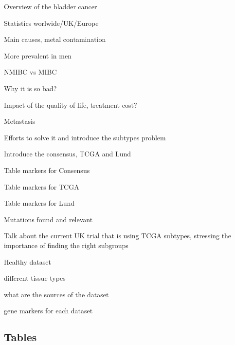 \begin{todolist}
    \item Overview of the bladder cancer 
    \begin{todolist}
        \item [\done] Statistics worlwide/UK/Europe
        \item [\done] Main causes, metal contamination
        \item [\done] More prevalent in men
        \item [\done] NMIBC vs MIBC
    \end{todolist}
    \item Why it is so bad? 
    \begin{todolist}
        \item [\done] Impact of the quality of life, treatment cost?
        \item [\done] Metastasis
    \end{todolist}
    \item Efforts to solve it and introduce the subtypes problem
    \item Introduce the consensus, TCGA and Lund
    \begin{todolist}
        \item [\done] Table markers for Consensus
        \item [\done] Table markers for TCGA
        \item [\done] Table markers for Lund
        \item [\done] Mutations found and relevant
    \end{todolist}
    \item Talk about the current UK trial that is using TCGA subtypes, stressing the importance of finding the right subgroups
    \item Healthy dataset 
    \begin{todolist}
        \item different tissue types
        \item what are the sources of the dataset
        \item gene markers for each dataset
    \end{todolist}

\end{todolist}


\subsection{Tables}



